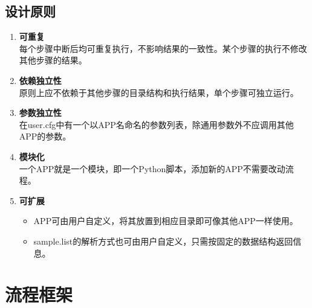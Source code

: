 \documentclass[UTF8,10pt,a4paper]{ctexart}
\begin{document}
\subsection{设计原则}
\begin{enumerate}
\item \textbf{可重复}\\
 每个步骤中断后均可重复执行，不影响结果的一致性。某个步骤的执行不修改其他步骤的结果。
\item \textbf{依赖独立性}\\
原则上应不依赖于其他步骤的目录结构和执行结果，单个步骤可独立运行。
\item \textbf{参数独立性}\\
 在user.cfg中有一个以APP名命名的参数列表，除通用参数外不应调用其他APP的参数。
\item \textbf{模块化}\\
 一个APP就是一个模块，即一个Python脚本，添加新的APP不需要改动流程。
\item \textbf{可扩展}
\begin{itemize}
\item APP可由用户自定义，将其放置到相应目录即可像其他APP一样使用。
\item sample.list的解析方式也可由用户自定义，只需按固定的数据结构返回信息。
\end{itemize}



\end{enumerate}
\newpage
\section{流程框架}
\label{sec:2}
\end{document}
